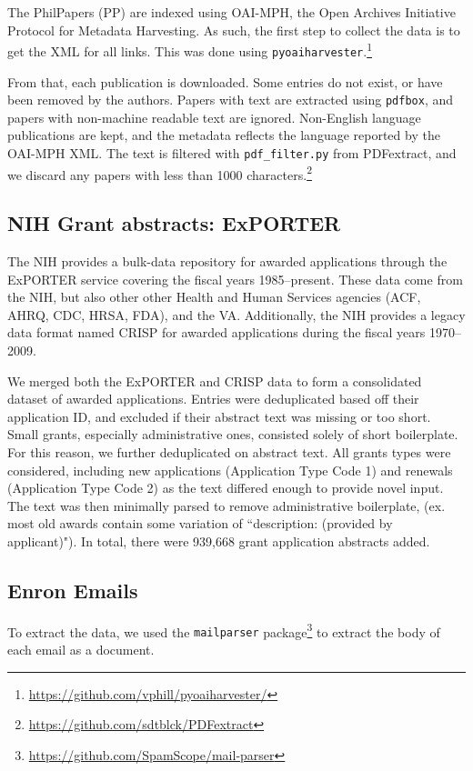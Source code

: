 \documentclass[11pt,a4paper]{article}
\begin{document}
\begin{appendices}
The PhilPapers (PP) are indexed using OAI-MPH, the Open Archives Initiative Protocol for Metadata Harvesting. As such, the first step to collect the data is to get the XML for all links. This was done using \texttt{pyoaiharvester}.\footnote{\url{https://github.com/vphill/pyoaiharvester/}}

From that, each publication is downloaded. Some entries do not exist, or have been removed by the authors. Papers with text are extracted using \texttt{pdfbox}, and papers with non-machine readable text are ignored. Non-English language publications are kept, and the metadata reflects the language reported by the OAI-MPH XML. The text is filtered with \texttt{pdf\_filter.py} from PDFextract, and we discard any papers with less than 1000 characters.\footnote{\url{https://github.com/sdtblck/PDFextract}}

\subsection{NIH Grant abstracts: ExPORTER}

The NIH provides a bulk-data repository for awarded applications through the ExPORTER service covering the fiscal years 1985--present. These data come from the NIH, but also other other Health and Human Services agencies (ACF, AHRQ, CDC, HRSA, FDA), and the VA. Additionally, the NIH provides a legacy data format named CRISP for awarded applications during the fiscal years 1970--2009.

We merged both the ExPORTER and CRISP data to form a consolidated dataset of awarded applications. Entries were deduplicated based off their application ID, and excluded if their abstract text was missing or too short. Small grants, especially administrative ones, consisted solely of short boilerplate. For this reason, we further deduplicated on abstract text. All grants types were considered, including new applications (Application Type Code 1) and renewals (Application Type Code 2) as the text differed enough to provide novel input. The text was then minimally parsed to remove administrative boilerplate, (ex. most old awards contain some variation of ``description: (provided by applicant)"). In total, there were 939,668 grant application abstracts added.

\subsection{Enron Emails}

To extract the data, we used the {\tt mailparser} package\footnote{\url{https://github.com/SpamScope/mail-parser}} to extract the body of each email as a document.


\end{appendices}
\end{document}
